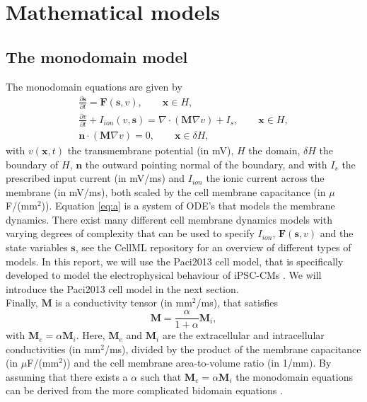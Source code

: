 \documentclass[12pt,a4paper]{article}
\begin{document}
\section{Mathematical models} \label{Mathematical models}
\subsection{The monodomain model} \label{The monodomain model}
The monodomain equations are given by 
\begin{eqnarray} \label{eq:a}
\frac{\partial \mathbf{s}}{\partial t}= \mathbf{F}(\mathbf{s},v), \qquad \mathbf{x} \in H, \\
\frac{\partial v}{\partial t} + I_{ion}(v,\mathbf{s}) =\nabla \label{eq:b} \cdot(\mathbf{M}\nabla v) + I_s,\qquad \mathbf{x} \in H, \\ \label{eq:c}
\mathbf{n}\cdot (\mathbf{M}\nabla v)=0, \qquad \mathbf{x} \in \delta H,
\end{eqnarray}
with $v(\mathbf{x},t)$ the transmembrane potential (in mV), $H$ the domain, $\delta H$ the boundary of $H$, $\mathbf{n}$ the outward pointing normal of the boundary, and with $I_s$ the prescribed input current (in mV/ms) and $I_{ion}$ the ionic current across the membrane (in mV/ms), both scaled by the cell membrane capacitance (in $\mu$F/(mm$^2$)). 
Equation \eqref{eq:a} is a system of ODE's that models the membrane dynamics. There exist many different cell membrane dynamics models with varying degrees of complexity that can be used to specify $I_{ion}$, $\mathbf{F}(\mathbf{s},v)$ and the state variables $\mathbf{s}$, see the CellML repository \cite{cellml} for an overview of different types of models. In this report, we will use the Paci2013 cell model, that is specifically developed to model the electrophysical behaviour of iPSC-CMs \cite{Paci2013}. We will introduce the Paci2013 cell model in the next section.\\ Finally, $\mathbf{M}$ is a conductivity tensor (in mm$^2$/ms), that satisfies 
\begin{equation}
\mathbf{M}=\frac{\alpha}{1+\alpha}\mathbf{M}_i,\label{eq:d}
\end{equation}
with $\mathbf{M}_e=\alpha \mathbf{M}_i$. Here, $\mathbf{M}_e$ and $\mathbf{M}_i$ are the extracellular and intracellular conductivities (in mm$^2$/ms), divided by the product of the membrane capacitance (in $\mu$F/(mm$^2$)) and the cell membrane area-to-volume ratio (in 1/mm). By assuming that there exists a $\alpha$ such that $\mathbf{M}_e=\alpha \mathbf{M}_i$ the monodomain equations can be derived from the more complicated bidomain equations \cite[p. 566-568]{KeenerII}.
\end{document}
